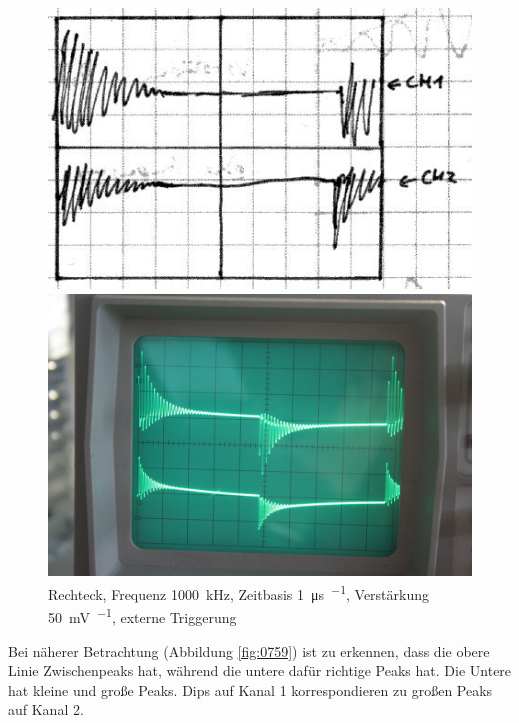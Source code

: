 \begin{figure}
	\centering
	\begin{minipage}{.45\linewidth}
	\includegraphics[width=\linewidth]{Skizzen/IMG_0757-1500.jpg}
	\end{minipage}
	\hfill
	\begin{minipage}{.45\linewidth}
	\includegraphics[width=\linewidth]{Fotos/IMG_0757-1500.jpg}
	\end{minipage}
	\caption{%
		Rechteck, Frequenz \SI{1000}{\kilo\hertz}, Zeitbasis \SI{1}{\micro\second\per\division}, Verstärkung \SI{50}{\milli\volt\per\division}, externe Triggerung
	}
	\label{fig:0757}
\end{figure}

Bei näherer Betrachtung (Abbildung \ref{fig:0759}) ist zu erkennen, dass die
obere Linie Zwischenpeaks hat, während die untere dafür richtige Peaks hat. Die
Untere hat kleine und große Peaks. Dips auf Kanal 1 korrespondieren zu großen
Peaks auf Kanal 2.

